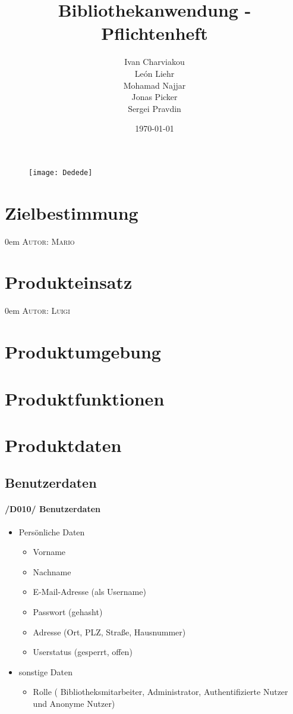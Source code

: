 \documentclass{article}
\title{Bibliothekanwendung - Pflichtenheft}
\date{\today}
\author{
	Ivan Charviakou\\
	León Liehr\\
	Mohamad Najjar\\
	Jonas Picker\\
	Sergei Pravdin
}
\makeatletter
\newcommand{\sectionauthor}[1]{
	{\parindent 0em \large \scshape Autor: #1 \par \nobreak \vspace*{2em}}
	\@afterheading
}
\makeatother
\begin{document}
\maketitle
\begin{figure}[h]
	\centering
	\texttt{[image: Dedede]}
\end{figure}
\newpage

\section{Zielbestimmung}
\sectionauthor{Mario}

\newpage

\section{Produkteinsatz}
\sectionauthor{Luigi}

\newpage

\section{Produktumgebung}

\newpage

\section{Produktfunktionen}

\newpage

\section{Produktdaten}
\subsection{Benutzerdaten}
	\label{D010} \paragraph{/D010/ Benutzerdaten}
\begin{itemize}
    	\item Persönliche Daten
		\begin{itemize}
			\item Vorname
			\item Nachname
			\item E-Mail-Adresse (als Username)
			\item Passwort (gehasht)
			\item Adresse (Ort, PLZ, Straße, Hausnummer)
			\item Userstatus (gesperrt, offen)
		\end{itemize}
		
		
		\item sonstige Daten
		\begin{itemize}
		    \item Rolle ( Bibliotheksmitarbeiter, Administrator, Authentifizierte Nutzer und Anonyme Nutzer) 
		\end{itemize}
	\end{itemize}
\end{document}
